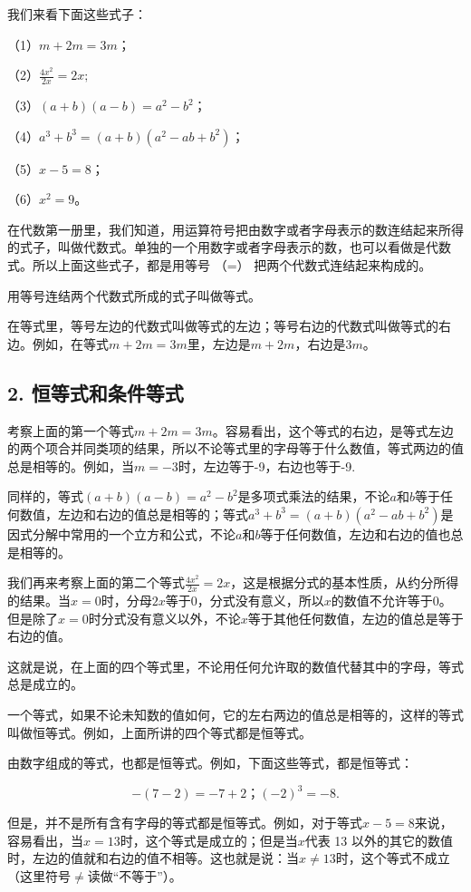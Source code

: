我们来看下面这些式子：

（1）\(m + 2m = 3m\)；

（2）\(\frac{4x^2}{2x} = 2x;\)

（3）\((a + b)(a - b) = a^2 - b^2\)；

（4）\(a^3 + b^3 = (a + b)(a^2 - ab + b^2)\)；

（5）\(x - 5 = 8\)；

（6）\(x^{2} = 9\)。

在代数第一册里，我们知道，用运算符号把由数字或者字母表示的数连结起来所得的式子，叫做代数式。单独的一个用数字或者字母表示的数，也可以看做是代数式。所以上面这些式子，都是用等号
（=） 把两个代数式连结起来构成的。

用等号连结两个代数式所成的式子叫做等式。

在等式里，等号左边的代数式叫做等式的左边；等号右边的代数式叫做等式的右边。例如，在等式\(m + 2m = 3m\)里，左边是\(m + 2m\)，右边是\(3m\)。

\subsection{2. 恒等式和条件等式}

考察上面的第一个等式\(m + 2m = 3m\)。容易看出，这个等式的右边，是等式左边的两个项合并同类项的结果，所以不论等式里的字母等于什么数值，等式两边的值总是相等的。例如，当\(m = -3\)时，左边等于-9，右边也等于-9.

同样的，等式\((a + b)(a - b) = a^2 - b^2\)是多项式乘法的结果，不论\(a\)和\(b\)等于任何数值，左边和右边的值总是相等的；等式\(a^3 + b^3 = (a + b)(a^2 - ab + b^2)\)是因式分解中常用的一个立方和公式，不论\(a\)和\(b\)等于任何数值，左边和右边的值也总是相等的。

我们再来考察上面的第二个等式\(\frac{4x^2}{2x} = 2x\)，这是根据分式的基本性质，从约分所得的结果。当\(x = 0\)时，分母\(2x\)等于0，分式没有意义，所以\(x\)的数值不允许等于0。但是除了\(x = 0\)时分式没有意义以外，不论\(x\)等于其他任何数值，左边的值总是等于右边的值。

这就是说，在上面的四个等式里，不论用任何允许取的数值代替其中的字母，等式总是成立的。

一个等式，如果不论未知数的值如何，它的左右两边的值总是相等的，这样的等式叫做恒等式。例如，上面所讲的四个等式都是恒等式。

由数字组成的等式，也都是恒等式。例如，下面这些等式，都是恒等式：

\[
- (7 - 2) = - 7 + 2\text{；} (- 2) ^ {3} = - 8.
\]

但是，并不是所有含有字母的等式都是恒等式。例如，对于等式\(x - 5 = 8\)来说，容易看出，当\(x = 13\)时，这个等式是成立的；但是当\(x\)代表
13
以外的其它的数值时，左边的值就和右边的值不相等。这也就是说：当\(x \neq 13\)时，这个等式不成立
（这里符号\(\neq\)读做``不等于''）。

